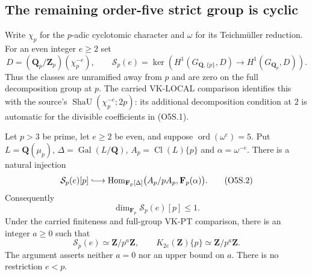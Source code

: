 \subsection{The remaining order-five strict group is cyclic}

Write $\chi_p$ for the $p$-adic cyclotomic character and
$\omega$ for its Teichm\"uller reduction.  For an even integer
$e\ge2$ set
\[
 D=(\mathbf Q_p/\mathbf Z_p)(\chi_p^{-e}),\qquad
 \mathcal S_p(e)=
 \ker\!\left(H^1(G_{\mathbf Q,\{p\}},D)
       \longrightarrow H^1(G_{\mathbf Q_p},D)\right).
 \tag{O5S.1}
\]
Thus the classes are unramified away from $p$ and are zero
on the full decomposition group at $p$.
The carried VK-LOCAL comparison identifies this with the
source's $\operatorname{ShaU}(\chi_p^{-e};2p)$: its additional
decomposition condition at $2$ is automatic for the divisible
coefficients in (O5S.1).

\begin{corollary}
Let $p>3$ be prime, let $e\ge2$ be even, and suppose
$\operatorname{ord}(\omega^e)=5$.
Put $L=\mathbf Q(\mu_p)$, $\Delta=\operatorname{Gal}(L/\mathbf Q)$,
$A_p=\operatorname{Cl}(L)\{p\}$ and $\alpha=\omega^{-e}$.
There is a natural injection
\[
 \mathcal S_p(e)[p]\lhook\joinrel\longrightarrow
 \operatorname{Hom}_{\mathbf F_p[\Delta]}
       \bigl(A_p/pA_p,\mathbf F_p(\alpha)\bigr).
 \tag{O5S.2}
\]
Consequently
\[
            \dim_{\mathbf F_p}\mathcal S_p(e)[p]\le1.
 \tag{O5S.3}
\]
Under the carried finiteness and full-group VK-PT comparison,
there is an integer $a\ge0$ such that
\[
 \mathcal S_p(e)\simeq\mathbf Z/p^a\mathbf Z,
 \qquad K_{2e}(\mathbf Z)\{p\}\simeq\mathbf Z/p^a\mathbf Z.
 \tag{O5S.4}
\]
The argument asserts neither $a=0$ nor an upper bound on $a$.
There is no restriction $e<p$.
\end{corollary}

